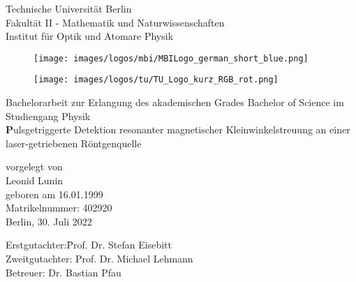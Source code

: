 \begin{titlepage}	
\noindent
\begin{minipage}{0.5\textwidth}
{\small
Technische Universit\"at Berlin\\
Fakult\"at II - Mathematik und Naturwissenschaften\\
Institut für Optik und Atomare Physik\\
}%
\end{minipage}%
\hfill
\begin{minipage}{0.18\textwidth}
\begin{figure}[H]%
\texttt{[image: images/logos/mbi/MBILogo\_german\_short\_blue.png]}
\end{figure}
\end{minipage}%
\hspace{5mm}
\begin{minipage}{0.18\textwidth}
\begin{figure}[H]%
\texttt{[image: images/logos/tu/TU\_Logo\_kurz\_RGB\_rot.png]}
\end{figure}
\end{minipage}%

\vspace{2cm}

\thispagestyle{empty}
\begin{center}

{\large Bachelorarbeit zur Erlangung des akademischen Grades
Bachelor of Science
im Studiengang Physik}\\
\vspace{1cm}
{\huge\textbf
Pulsgetriggerte Detektion resonanter magnetischer Kleinwinkelstreuung an einer laser-getriebenen Röntgenquelle}
\vspace{1.2cm}

{\large vorgelegt von\\
	 Leonid Lunin \\
	 geboren am 16.01.1999\\
	 Matrikelnummer: 402920\\[2cm]
	 Berlin, 30. Juli 2022\\[2cm]
}

\begin{minipage}{\linewidth} 
\begin{tabbing}
  		Erstgutachter:\quad \= Prof. Dr. Stefan Eisebitt\\[0.3cm]
  		Zweitgutachter: \> Prof. Dr. Michael Lehmann\\[0.3cm]
    	Betreuer:             \> Dr. Bastian Pfau \\
    						         
\end{tabbing}
\end{minipage}

\vspace{1.5cm}

\end{center}
\thispagestyle{empty}
\newpage
\setcounter{page}{1}
\end{titlepage}

\shipout\null
